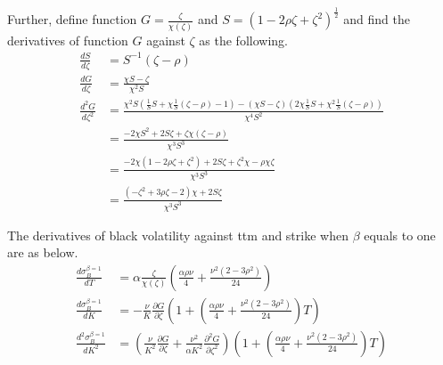 \documentclass{article}
\begin{document}
Further, define function $ G = \frac{\zeta}{\chi\left(\zeta\right)} $ and $ S = \left(1 - 2 \rho \zeta + \zeta^2\right)^{\frac{1}{2}} $ and find the derivatives of function $ G $ against $ \zeta $ as the following.
\begin{subequations} \label{d(z_per_xz)dz}
    \begin{align}
        \frac{d S}{d \zeta} &= S^{-1} \left(\zeta - \rho\right) \\
        \frac{d G}{d \zeta} &= \frac{\chi S - \zeta}{\chi^2 S} \\
        \frac{d^2 G}{d \zeta^2} &= \frac{\chi^2 S \left(\frac{1}{S} S + \chi \frac{1}{S} \left(\zeta - \rho\right) - 1\right) - \left(\chi S - \zeta\right) \left(2 \chi \frac{1}{S} S + \chi^2 \frac{1}{S} \left(\zeta - \rho\right)\right)}{\chi^4 S^2} \nonumber \\
        &= \frac{-2 \chi S^2 + 2 S \zeta + \zeta \chi \left(\zeta - \rho\right)}{\chi^3 S^3} \nonumber \\
        &= \frac{-2 \chi \left(1 - 2\rho \zeta + \zeta^2\right) + 2 S \zeta + \zeta^2 \chi - \rho \chi \zeta}{\chi^3 S^3} \nonumber \\
        &= \frac{\left(-\zeta^2 + 3 \rho \zeta - 2\right) \chi + 2 S \zeta}{\chi^3 S^3}
    \end{align}
\end{subequations}

The derivatives of black volatility against ttm and strike when $ \beta $ equals to one are as below.
\begin{subequations}
    \begin{align}
        \frac{d \sigma_{B}^{\beta=1}}{d T} &= \alpha \frac{\zeta}{\chi \left(\zeta\right)} \left(\frac{\alpha \rho \nu}{4} + \frac{\nu^2 \left(2 - 3 \rho^2\right)}{24}\right) \label{dSigdT} \\
        \frac{d \sigma_{B}^{\beta=1}}{d K} &= -\frac{\nu}{K} \frac{\partial G}{\partial \zeta} \left(1 + \left(\frac{\alpha \rho \nu}{4} + \frac{\nu^2 \left(2 - 3 \rho^2\right)}{24}\right) T\right) \label{dSigdK} \\
        \frac{d^2 \sigma_{B}^{\beta=1}}{d K^2} &= \left(\frac{\nu}{K^2} \frac{\partial G}{\partial \zeta} + \frac{\nu^2}{\alpha K^2} \frac{\partial^2 G}{\partial \zeta^2}\right) \left(1 + \left(\frac{\alpha \rho \nu}{4} + \frac{\nu^2 \left(2 - 3 \rho^2\right)}{24}\right) T\right) \label{dSig2dK2}
    \end{align}
\end{subequations}
\end{document}
